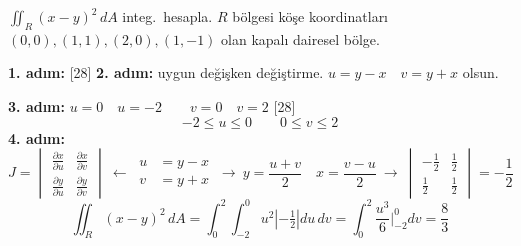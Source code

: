 \documentclass[11pt,a4paper]{article}
\begin{document}
\begin{ornek}
$\displaystyle\iint_R (x-y)^2\,dA$ integ.\ hesapla. $R$ bölgesi köşe koordinatları $(0,0),(1,1),(2,0),(1,-1)$ olan kapalı dairesel bölge.
\end{ornek}
\noindent\textbf{1. adım:}
[28]
\noindent\textbf{2. adım:} uygun değişken değiştirme. \quad $u=y-x\quad v=y+x$ olsun.

\noindent\textbf{3. adım:} $u=0\quad u=-2\qquad v=0\quad v=2$
[28]
\[ -2\le u\le0\qquad 0\le v\le2 \]
\noindent\textbf{4. adım:}
\[ J=\begin{vmatrix}\frac{\partial x}{\partial u}&\frac{\partial x}{\partial v}\\[2pt]\frac{\partial y}{\partial u}&\frac{\partial y}{\partial v}\end{vmatrix}\ \longleftarrow\ \begin{aligned}u&=y-x\\v&=y+x\end{aligned}\ \longrightarrow\ y=\frac{u+v}{2}\quad x=\frac{v-u}{2}\ \longrightarrow\ \begin{vmatrix}-\frac12&\frac12\\[2pt]\frac12&\frac12\end{vmatrix}=-\frac12 \]
\[ \iint_R (x-y)^2\,dA=\int_0^2\!\!\int_{-2}^0 u^2\left|-\tfrac12\right|du\,dv=\int_0^2\frac{u^3}{6}\Big|_{-2}^0dv=\frac83 \]
\end{document}

